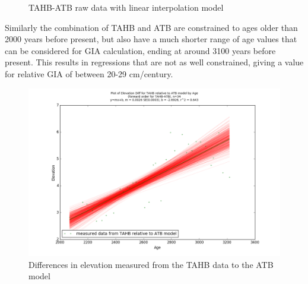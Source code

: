 \begin{figure}[h]
	\caption{TAHB-ATB raw data with linear interpolation model}
	\label{fig:data_TAHBxATB}
\end{figure}

Similarly the combination of TAHB and ATB are constrained to ages older than
2000 years before present, but also have a much shorter range of age values that
can be considered for GIA calculation, ending at around 3100 years before present.
This results in regressions that are not as well constrained, giving a value for
relative GIA of between 20-29 cm/century.

\newpage

\begin{figure}[h]
	\includegraphics[width=0.9\linewidth]{data/bothNonZero/withinSeventyFivePercent/gias/theGIA_TAHB_relative_to_ATB.png}
	\caption{Differences in elevation measured from the TAHB data to the ATB model}
	\label{fig:gias_TAHBxATB}
\end{figure}
\newpage


